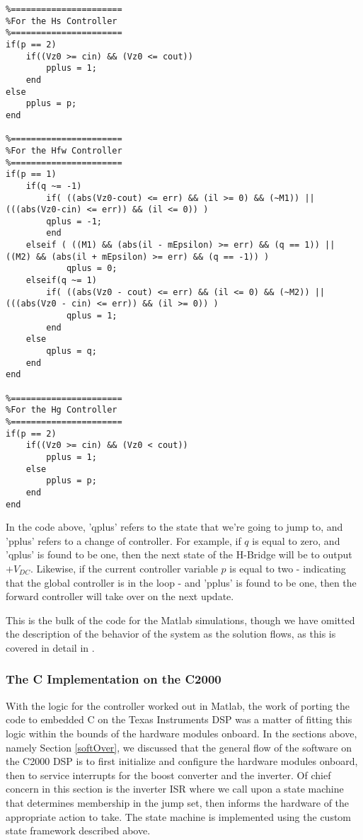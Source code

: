\begin{lstlisting}
%======================
%For the Hs Controller
%======================
if(p == 2)
    if((Vz0 >= cin) && (Vz0 <= cout))
        pplus = 1;
    end
else
    pplus = p;    
end

%======================
%For the Hfw Controller
%======================
if(p == 1)    
    if(q ~= -1)
        if( ((abs(Vz0-cout) <= err) && (il >= 0) && (~M1)) || (((abs(Vz0-cin) <= err)) && (il <= 0)) )
        qplus = -1;
        end
    elseif ( ((M1) && (abs(il - mEpsilon) >= err) && (q == 1)) || ((M2) && (abs(il + mEpsilon) >= err) && (q == -1)) )
            qplus = 0;
    elseif(q ~= 1)
        if( ((abs(Vz0 - cout) <= err) && (il <= 0) && (~M2)) || (((abs(Vz0 - cin) <= err)) && (il >= 0)) )
            qplus = 1;
        end
    else
        qplus = q;        
    end
end

%======================
%For the Hg Controller
%======================
if(p == 2)
    if((Vz0 >= cin) && (Vz0 < cout))
        pplus = 1;
    else
        pplus = p;
    end
end
\end{lstlisting}

In the code above, 'qplus' refers to the state that we're going to jump to, and 'pplus' refers to a change of controller. For example, if $q$ is equal to zero, and 'qplus' is found to be one, then the next state of the H-Bridge will be to output $+V_{DC}$. Likewise, if the current controller variable $p$ is equal to two - indicating that the global controller is in the loop - and 'pplus' is found to be one, then the forward controller will take over on the next update. 

This is the bulk of the code for the Matlab simulations, though we have omitted the description of the behavior of the system as the solution flows, as this is covered in detail in \cite{ricardo}.

\subsubsection{The C Implementation on the C2000}
With the logic for the controller worked out in Matlab, the work of porting the code to embedded C on the Texas Instruments DSP was a matter of fitting this logic within the bounds of the hardware modules onboard.
In the sections above, namely Section \ref{softOver}, we discussed that the general flow of the software on the C2000 DSP is to first initialize and configure the hardware modules onboard, then to service interrupts for the boost converter and the inverter. Of chief concern in this section is the inverter ISR where we call upon a state machine that determines membership in the jump set, then informs the hardware of the appropriate action to take. The state machine is implemented using the custom state framework described above.

